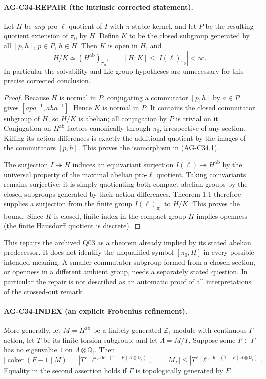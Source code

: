 \documentclass[11pt,a4paper]{article}
\begin{document}
\paragraph{AG-C34-REPAIR (the intrinsic corrected statement).}
Let $H$ be \emph{any} pro-$\ell$ quotient of $I$ with $\pi$-stable
kernel, and let $P$ be the resulting quotient extension of $\pi_0$ by
$H$. Define $K$ to be the closed subgroup generated by all
$[p,h]$, $p\in P$, $h\in H$. Then $K$ is open in $H$, and
\[
 H/K\simeq (H^{\mathrm{ab}})_{\pi_0},
 \qquad [H:K]\le |I(\ell)_{\pi_0}|<\infty.       \tag{AG-C34.1}
\]
In particular the solvability and Lie-group hypotheses are unnecessary
for this precise corrected conclusion.

\begin{proof}
Because $H$ is normal in $P$, conjugating a commutator $[p,h]$ by
$a\in P$ gives $[apa^{-1},aha^{-1}]$. Hence $K$ is normal in $P$.
It contains the closed commutator subgroup of $H$, so $H/K$ is abelian;
all conjugation by $P$ is trivial on it. Conjugation on
$H^{\mathrm{ab}}$ factors canonically through $\pi_0$, irrespective
of any section. Killing its action differences is exactly the additional
quotient by the images of the commutators $[p,h]$. This proves the
isomorphism in (AG-C34.1).

The surjection $I\twoheadrightarrow H$ induces an equivariant
surjection $I(\ell)\twoheadrightarrow H^{\mathrm{ab}}$ by the
universal property of the maximal abelian pro-$\ell$ quotient.
Taking coinvariants remains surjective: it is simply quotienting both
compact abelian groups by the closed subgroups generated by their
action differences. Theorem 1.1 therefore supplies a surjection from
the finite group $I(\ell)_{\pi_0}$ to $H/K$. This proves the bound.
Since $K$ is closed, finite index in the compact group $H$ implies
openness (the finite Hausdorff quotient is discrete).
\end{proof}

This repairs the archived Q03 as a theorem already implied by its
stated abelian predecessor. It does not identify the unqualified
symbol $[\pi_0,H]$ in every possible intended meaning. A smaller
commutator subgroup formed from a chosen section, or openness in a
different ambient group, needs a separately stated question. In
particular the repair is not described as an automatic proof of all
interpretations of the crossed-out remark.

\paragraph{AG-C34-INDEX (an explicit Frobenius refinement).}
More generally, let $M=H^{\mathrm{ab}}$ be a finitely generated
$\mathbb Z_\ell$-module with continuous $\Gamma$-action, let $T$ be
its finite torsion subgroup, and let $\Lambda=M/T$. Suppose some
$F\in\Gamma$ has no eigenvalue $1$ on
$\Lambda\otimes\mathbb Q_\ell$. Then
\[
 |\operatorname{coker}(F-1\mid M)|
   =|T^F|\ell^{v_\ell\det(1-F\mid\Lambda\otimes\mathbb Q_\ell)},
 \qquad
 |M_\Gamma|\le
 |T^F|\ell^{v_\ell\det(1-F\mid\Lambda\otimes\mathbb Q_\ell)}.
                                                               \tag{AG-C34.2}
\]
Equality in the second assertion holds if $\Gamma$ is topologically
generated by $F$.
\end{document}
